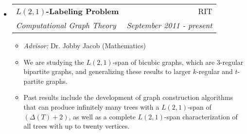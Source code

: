 \documentclass[letterpaper,10pt]{article}
\makeatletter
\newcommand{\resitem}[1]{\item #1 \vspace{-2pt}}
\newcommand{\ressubheading}[4]{
\begin{tabular*}{6.5in}{l@{\cftdotfill{\cftsecdotsep}\extracolsep{\fill}}r}
		\textbf{#1} & #2 \\
		\textit{#3} & \textit{#4} \\
\end{tabular*}\vspace{-6pt}}
\makeatother
\begin{document}
\begin{itemize}
	

\item
	\ressubheading{$L(2,1)$-Labeling Problem}{RIT}{Computational Graph Theory}{September 2011 - present}
	\begin{itemize}
		\resitem{\emph{Advisor:} Dr. Jobby Jacob (Mathematics)}
		\resitem{We are studying the $L(2,1)$-span of bicubic graphs, which are $3$-regular bipartite graphs, and generalizing these results to larger $k$-regular and $t$-partite graphs.}
		\resitem{Past results include the development of graph construction algorithms that can produce infinitely many trees with a $L(2,1)$-span of $(\Delta(T) + 2)$, as well as a complete $L(2,1)$-span characterization of all trees with up to twenty vertices.}
	\end{itemize}


\end{itemize}
\end{document}

